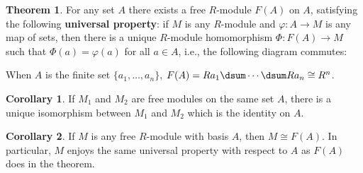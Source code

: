 \documentclass[12pt]{article}
\newcommand{\keyword}[1]{\textbf{#1}}
\theoremstyle{definition}
\newtheorem{theorem}{Theorem}
\newtheorem{corollary}{Corollary}
\renewcommand{\phi}{\varphi}
\newcommand{\<}{\left\langle}
\renewcommand{\>}{\right\rangle}
\newcommand{\isom}{\cong}
\begin{document}
\newpage
\begin{theorem}
    For any set $A$ there exists a free $R$-module $F(A)$ on $A$, satisfying the following \keyword{universal property}: if $M$ is any $R$-module and $\phi : A \to M$ is any map of sets, then there is a unique $R$-module homomorphism $\Phi : F(A) \to M$ such that $\Phi(a) = \phi(a)$ for all $a \in A$, i.e., the following diagram commutes:
    \begin{center}
    \end{center}
    \begin{center}
    \end{center}
    \begin{center}
    \end{center}
    When $A$ is the finite set $\{a_1, \dots, a_n\}$, $F(A) = Ra_1 \dsum \cdots \dsum Ra_n \isom R^n$.
\end{theorem}

\begin{corollary}
    If $M_1$ and $M_2$ are free modules on the same set $A$, there is a unique isomorphism between $M_1$ and $M_2$ which is the identity on $A$.
\end{corollary}

\begin{corollary}
    If $M$ is any free $R$-module with basis $A$, then $M \isom F(A)$. In particular, $M$ enjoys the same universal property with respect to $A$ as $F(A)$ does in the theorem.
\end{corollary}
\end{document}
